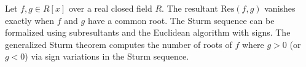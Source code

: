 Let $f, g \in R[x]$ over a real closed field $R$. The resultant $\text{Res}(f, g)$ vanishes exactly when $f$ and $g$ have a common root. The Sturm sequence can be formalized using subresultants and the Euclidean algorithm with signs. The generalized Sturm theorem computes the number of roots of $f$ where $g > 0$ (or $g < 0$) via sign variations in the Sturm sequence.
